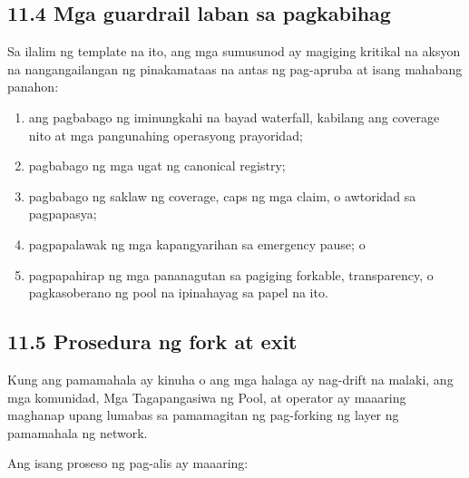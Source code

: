 \documentclass[11pt]{article}
\begin{document}
\subsection*{11.4 Mga guardrail laban sa pagkabihag}

Sa ilalim ng template na ito, ang mga sumusunod ay magiging kritikal na aksyon na nangangailangan ng pinakamataas na antas ng pag-apruba at isang mahabang panahon:

\begin{enumerate}[leftmargin=*]
\item ang pagbabago ng iminungkahi na bayad waterfall, kabilang ang coverage nito at mga pangunahing operasyong prayoridad;
\item pagbabago ng mga ugat ng canonical registry;
\item pagbabago ng saklaw ng coverage, caps ng mga claim, o awtoridad sa pagpapasya;
\item pagpapalawak ng mga kapangyarihan sa emergency pause; o
\item pagpapahirap ng mga pananagutan sa pagiging forkable, transparency, o pagkasoberano ng pool na ipinahayag sa papel na ito.
\end{enumerate}
\subsection*{11.5 Prosedura ng fork at exit}

Kung ang pamamahala ay kinuha o ang mga halaga ay nag-drift na malaki, ang mga komunidad, Mga Tagapangasiwa ng Pool, at operator ay maaaring maghanap upang lumabas sa pamamagitan ng pag-forking ng layer ng pamamahala ng network.

Ang isang proseso ng pag-alis ay maaaring:
\end{document}
